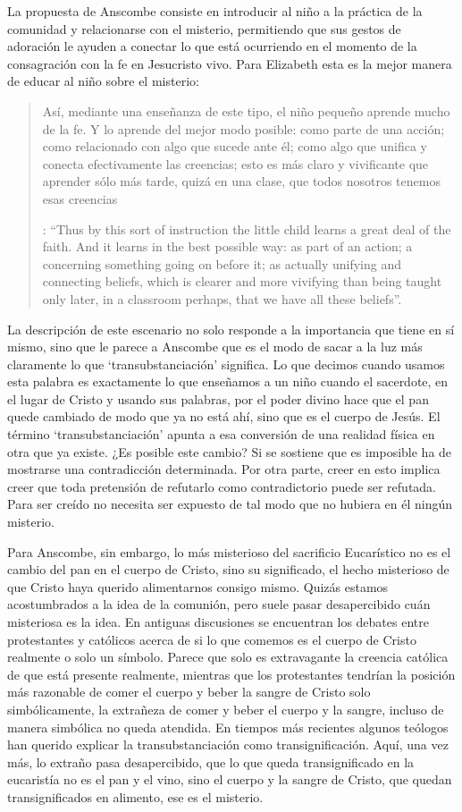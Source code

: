 La propuesta de Anscombe consiste en introducir al niño a la práctica de la comunidad y relacionarse con el misterio, permitiendo que sus gestos de adoración le ayuden a conectar lo que está ocurriendo en el momento de la consagración con la fe en Jesucristo vivo. Para Elizabeth esta es la mejor manera de educar al niño sobre el misterio: \blockquote[
{\Cite[107]{anscombe1981erp:ot}}: \enquote{Thus by this sort of instruction the little child learns a great deal of the faith. And it learns in the best possible way: as part of an action; a concerning something going on before it; as actually unifying and connecting beliefs, which is clearer and more vivifying than being taught only later, in a classroom perhaps, that we have all these beliefs}.
]{Así, mediante una enseñanza de este tipo, el niño pequeño aprende mucho de la fe. Y lo aprende del mejor modo posible: como parte de una acción; como relacionado con algo que sucede ante él; como algo que unifica y conecta efectivamente las creencias; esto es más claro y vivificante que aprender sólo más tarde, quizá en una clase, que todos nosotros tenemos esas creencias}.

La descripción de este escenario no solo responde a la importancia que tiene en sí mismo, sino que le parece a Anscombe que es el modo de sacar a la luz más claramente lo que `transubstanciación' significa. Lo que decimos cuando usamos esta palabra es exactamente lo que enseñamos a un niño cuando el sacerdote, en el lugar de Cristo y usando sus palabras, por el poder divino hace que el pan quede cambiado de modo que ya no está ahí, sino que es el cuerpo de Jesús. El término `transubstanciación' apunta a esa conversión de una realidad física en otra que ya existe. ¿Es posible este cambio? Si se sostiene que es imposible ha de mostrarse una contradicción determinada. Por otra parte, creer en esto implica creer que toda pretensión de refutarlo como contradictorio puede ser refutada. Para ser creído no necesita ser expuesto de tal modo que no hubiera en él ningún misterio.

Para Anscombe, sin embargo, lo más misterioso del sacrificio Eucarístico no es el cambio del pan en el cuerpo de Cristo, sino su significado, el hecho misterioso de que Cristo haya querido alimentarnos consigo mismo. Quizás estamos acostumbrados a la idea de la comunión, pero suele pasar desapercibido cuán misteriosa es la idea. En antiguas discusiones se encuentran los debates entre protestantes y católicos acerca de si lo que comemos es el cuerpo de Cristo realmente o solo un símbolo. Parece que solo es extravagante la creencia católica de que está presente realmente, mientras que los protestantes tendrían la posición más razonable de comer el cuerpo y beber la sangre de Cristo solo simbólicamente, la extrañeza de comer y beber el cuerpo y la sangre, incluso de manera simbólica no queda atendida. En tiempos más recientes algunos teólogos han querido explicar la transubstanciación como transignificación. Aquí, una vez más, lo extraño pasa desapercibido, que lo que queda transignificado en la eucaristía no es el pan y el vino, sino el cuerpo y la sangre de Cristo, que quedan transignificados en alimento, ese es el misterio.

